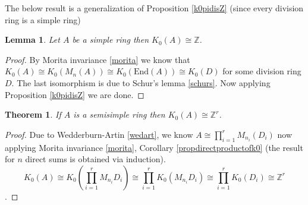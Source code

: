 \documentclass[12pt]{report}
\numberwithin{equation}{section}
\newcommand{\Z}{\mathbb{Z}}
\newcounter{dummy} \numberwithin{dummy}{section}
\newtheorem{theorem}[dummy]{Theorem}
\newtheorem{lemma}[dummy]{Lemma}
\begin{document}
	The below result is a generalization of Proposition \ref{k0pidisZ} (since every division ring is a simple ring)
	\begin{lemma}
		Let $A$ be a simple ring then $K_0(A) \cong \Z $.
	\end{lemma}
	\begin{proof}
		By Morita invariance \ref{morita} we know that $K_0(A) \cong K_0(M_n(A)) \cong K_0(\mathrm{End}(A)) \cong K_0(D)$ for some division ring $D$. The last isomorphism is due to Schur's lemma \ref{schurs}. Now applying Proposition \ref{k0pidisZ} we are done.
	\end{proof}
	\begin{theorem}
		If $A$ is a semisimple ring then $K_0(A)\cong \Z^r$.
	\end{theorem}
	\begin{proof}
		Due to Wedderburn-Artin \ref{wedart}, we know $A \cong \prod_{i=1}^r M_{n_i} (D_i)$ now applying Morita invariance \ref{morita}, Corollary \ref{propdirectproductofk0} (the result for $n$ direct sums is obtained via induction).
		 $$K_0(A) \cong K_0\left(\prod_{i=1}^r M_{n_i} D_i\right) \cong \prod_{i=1}^r K_0\left( M_{n_i}D_i\right) \cong \prod_{i=1}^r K_0(D_i) \cong \Z^r$$.
	\end{proof}
	
\end{document}
